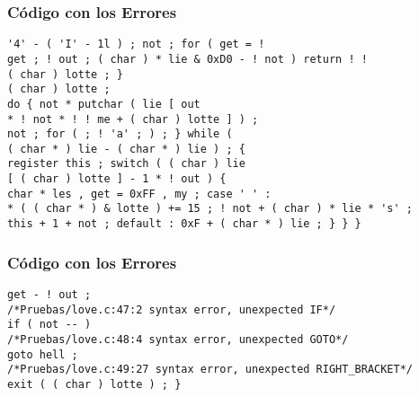 \documentclass{beamer}
\begin{document}
\begin{frame}[fragile]
\frametitle{C\'odigo con los Errores}
\begin{verbatim}
'4' - ( 'I' - 1l ) ; not ; for ( get = ! 
get ; ! out ; ( char ) * lie & 0xD0 - ! not ) return ! ! 
( char ) lotte ; } 
( char ) lotte ; 
do { not * putchar ( lie [ out 
* ! not * ! ! me + ( char ) lotte ] ) ; 
not ; for ( ; ! 'a' ; ) ; } while ( 
( char * ) lie - ( char * ) lie ) ; { 
register this ; switch ( ( char ) lie 
[ ( char ) lotte ] - 1 * ! out ) { 
char * les , get = 0xFF , my ; case ' ' : 
* ( ( char * ) & lotte ) += 15 ; ! not + ( char ) * lie * 's' ; 
this + 1 + not ; default : 0xF + ( char * ) lie ; } } } 
\end{verbatim}
\end{frame}
\begin{frame}[fragile]
\frametitle{C\'odigo con los Errores}
\begin{verbatim}
get - ! out ; 
/*Pruebas/love.c:47:2 syntax error, unexpected IF*/
if ( not -- ) 
/*Pruebas/love.c:48:4 syntax error, unexpected GOTO*/
goto hell ; 
/*Pruebas/love.c:49:27 syntax error, unexpected RIGHT_BRACKET*/
exit ( ( char ) lotte ) ; } \end{verbatim}
\end{frame}
\end{document}
